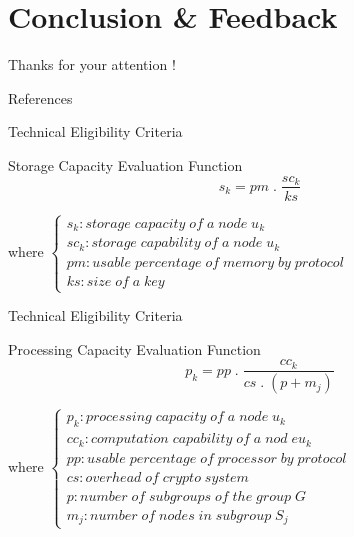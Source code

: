 \documentclass{beamer}
\begin{document}
\section{Conclusion \& Feedback}

\begin{frame}[focus]
	Thanks for your attention !
\end{frame}

\appendix

\begin{frame}{References}
	\nocite{*} %
	
	
\end{frame}


\begin{frame}{Technical Eligibility Criteria}
	\begin{block}{Storage Capacity Evaluation Function}
		\begin{equation*}
			s_k = pm \; .\; \frac{sc_k}{ks}
		\end{equation*}
	\end{block}
	\vfill
	where
	\begin{math}
		\left\{
		\begin{array}{l}
			s_k: storage\; capacity\; of\; a\; node\; u_k\\
			sc_k: storage\; capability\; of\; a\; node\; u_k\\
			pm: usable\; percentage\; of\; memory\; by\; protocol\\
			ks: size\; of\; a\; key
		\end{array}
		\right.
	\end{math}
\end{frame}

\begin{frame}{Technical Eligibility Criteria}
	\begin{block}{Processing Capacity Evaluation Function}
		\begin{equation*}
			p_k = pp \; .\; \frac{cc_k}{cs \; .\; \left( p + m_j \right)}
		\end{equation*}
	\end{block}
	\vfill
	where
	\begin{math}
		\left\{
		\begin{array}{l}
			p_k: processing\; capacity\; of\; a\; node\; u_k\\
			cc_k: computation\; capability\; of\; a\; nod\;e u_k\\
			pp: usable\; percentage\; of\; processor\; by\; protocol\\
			cs: overhead\; of\; crypto\; system\\
			p: number\; of\; subgroups\; of\; the\; group\; G\\
			m_j: number\; of\; nodes\; in\; subgroup\; S_j
		\end{array}
		\right.
	\end{math}
\end{frame}
\end{document}
